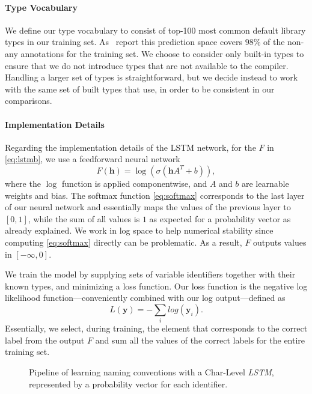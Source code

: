 \documentclass[acmsmall, review, anonymous]{acmart}\settopmatter{printfolios=true,printccs=false,printacmref=false}
\begin{document}
\paragraph{Type Vocabulary}
We define our type vocabulary to consist of top-100 most common default library types in our training set. As~\citet{wei20} report this prediction space covers $98\%$ of the non-any annotations for the training set. We choose to consider only built-in types 
to ensure that we do not introduce types that are not available to the compiler. Handling a larger set of types is straightforward, but we decide instead to work with the same set of built types that \citet{hellendoorn18, wei20} use, in order to be consistent in our comparisons.

\paragraph{Implementation Details}
Regarding the implementation details of the LSTM network, for the $F$ in \eqref{eq:lstmb},
we use a feedforward neural network
\begin{equation}
	F(\bm{h}) = \log\left( \sigma\left(\bm{h}A^T + b \right) \right),\label{eq:feedforward}
\end{equation}
where the $\log$ function is applied componentwise,
and $A$ and $b$ are learnable weights and bias.
The softmax function \eqref{eq:softmax} corresponds to the last layer of our neural network
and essentially maps the values of the previous layer to $[0, 1]$,
while the sum of all values is $1$ as expected for a probability vector as already explained.
We work in log space to help numerical stability since computing \eqref{eq:softmax} directly can be problematic.
As a result, $F$ outputs values in $[-\infty, 0]$.

We train the model by supplying sets of variable identifiers together with their known types,
and minimizing a loss function.
Our loss function is the negative log likelihood function---conveniently combined with our log output---defined as
\begin{equation}
	L(\bm{y}) = -\sum_i log(\bm{y}_i).
\end{equation}
Essentially, we select, during training, the element that corresponds
to the correct label from the output $F$
and sum all the values of the correct labels for the entire training set.



\begin{figure*}[!t]
    \centering
    \def\svgwidth{\linewidth}
    
  \caption{Pipeline of learning naming conventions with 
  a Char-Level \textit{LSTM}, represented by a probability vector for each identifier.
  }\label{fig:Char-Level}
\end{figure*}
\end{document}
